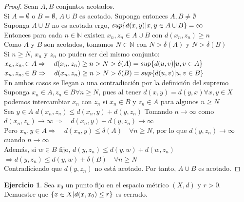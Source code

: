 \documentclass[11pt,a4paper,oneside]{report}
\theoremstyle{definition}
\newtheorem{ejercicio}[definicion]{Ejercicio}
\theoremstyle{plain}
\theoremstyle{remark}
\newcommand{\N}{\mathbb{N}}
\DeclarePairedDelimiter{\conj}{\{}{\}}
\begin{document}
\begin{proof}
  Sean $A,B$ conjuntos acotados.\\
  Si $A=\emptyset$ o $B=\emptyset$, $A\cup B$ es acotado. Suponga entonces $A,B \not = \emptyset$\\
  Suponga $A\cup B$ no es acotada ergo, $sup\conj{d(x,y)|x,y\in A\cup B}=\infty$\\
  Entonces para cada $n\in \N$ existen $x_n, z_n \in A\cup B$ con $d(x_n,z_n) \geq n$\\
  Como $A$ y $B$ son acotados, tomamos $N\in \N$ con $N>\delta(A)$ y $N>\delta(B)$\\
  Si $n\geq N$, $x_n$ y $z_n$ no puden ser del mismo conjunto:\\
  $x_n, z_n ,\in A \Rightarrow \quad d(x_n,z_n)\geq n>N> \delta(A)=sup\conj{d(u,v)|u,v\in A}$\\
  $x_n, z_n ,\in B \Rightarrow \quad d(x_n,z_n)\geq n>N> \delta(B)=sup\conj{d(u,v)|u,v\in B}$\\
  En ambos casos se llegan a una contradicción por la definición del supremo\\
  Suponga $x_n \in A, z_n\in B \forall n \geq N$, pues al tener 
  $d(x,y)=d(y,x) \forall x,y \in X$ podemos intercambiar $x_n$ con $z_n$ si $x_n \in B$ y $z_n \in A$
  para algunos $n \geq N$\\
  Sea $y\in A$ $d(x_n,z_n)\leq d(x_n,y)+ d(y,z_n)$ Tomando $n\rightarrow \infty$ como 
  $d(x_n,z_n)\rightarrow \infty \Rightarrow \quad d(x_n,y)+ d(y,z_n)\rightarrow \infty$\\
  Pero $x_n,y \in A \Rightarrow \quad d(x_n, y)\leq \delta(A) \quad \forall n\geq N$, por lo que 
  $d(y,z_n)\rightarrow \infty$ cuando $n\rightarrow \infty$\\
  Además, si $w\in B$ fijo, $d(y,z_n)\leq d(y,w)+d(w,z_n)$\\
  $\Rightarrow d(y,z_n)\leq d(y,w)+\delta(B) \quad \forall n\geq N$\\
  Contradiciendo que $d(y,z_n)$ no está acotado. Por tanto, $A\cup B$ es acotado.
\end{proof}

\begin{ejercicio}
  Sea $x_0$ un punto fijo en el espacio métrico $(X,d)$ y $r>0$. Demuestre que 
  $\conj{x\in X | d(x,x_0)\leq r}$ es cerrado. 
\end{ejercicio}
\end{document}
